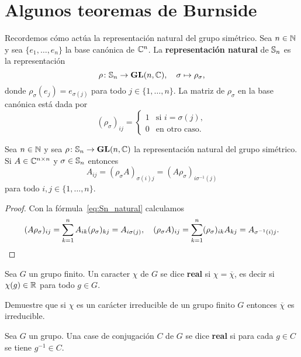 \chapter{Algunos teoremas de Burnside}

Recordemos cómo actúa la representación natural del grupo simétrico.  Sea
$n\in\mathbb{N}$ y sea $\{e_1,\dots,e_n\}$ la base canónica de $\mathbb{C}^n$.  La
\textbf{representación natural} de $\mathbb{S}_n$ es la representación 
\[
	\rho\colon\mathbb{S}_n\to\mathbf{GL}(n,\mathbb{C}),\quad
	\sigma\mapsto\rho_{\sigma},
\] 
donde $\rho_\sigma(e_j)=e_{\sigma(j)}$ para todo $j\in\{1,\dots,n\}$. 
La matriz de $\rho_\sigma$ en la base canónica está dada por 
\begin{equation}
    \label{eq:Sn_natural}
    (\rho_\sigma)_{ij}=\begin{cases}
      1 & \text{si $i=\sigma(j)$},\\
      0 & \text{en otro caso}.
    \end{cases}
\end{equation}

\begin{lemma}
	\label{lem:permutaciones}
	Sea $n\in\mathbb{N}$ y sea $\rho\colon\mathbb{S}_n\to\mathbf{GL}(n,\mathbb{C})$ la representación
	natural del grupo simétrico. Si $A\in\mathbb{C}^{n\times n}$ y $\sigma\in\mathbb{S}_n$ entonces 
	\[
		A_{ij}=(\rho_{\sigma}A)_{\sigma(i)j}=(A\rho_{\sigma})_{i\sigma^{-1}(j)}
	\]
	para todo $i,j\in\{1,\dots,n\}$.
\end{lemma}

\begin{proof}
	Con la fórmula~\eqref{eq:Sn_natural} calculamos
	\[
		(A\rho_{\sigma})_{ij}=\sum_{k=1}^n A_{ik}(\rho_{\sigma})_{kj}=A_{i\sigma(j)},
		\quad
		(\rho_\sigma A)_{ij}=\sum_{k=1}^n (\rho_\sigma)_{ik}A_{kj}=A_{\sigma^{-1}(i)j}.\qedhere
	\]
\end{proof}

\begin{definition}
  Sea $G$ un grupo finito. Un caracter $\chi$ de $G$ se dice \textbf{real} si
  $\chi=\overline{\chi}$, es decir si $\chi(g)\in\mathbb{R}$ para todo $g\in G$. 
\end{definition}

\begin{exercise}
	\label{xca:chi_irreducible}
	Demuestre que si $\chi$ es un carácter irreducible de un grupo finito $G$
	entonces $\overline{\chi}$ es irreducible.
\end{exercise}

\begin{definition}
  Sea $G$ un grupo. Una case de conjugación $C$ de $G$ se dice \textbf{real} si
  para cada $g\in C$ se tiene $g^{-1}\in C$. 
\end{definition}

